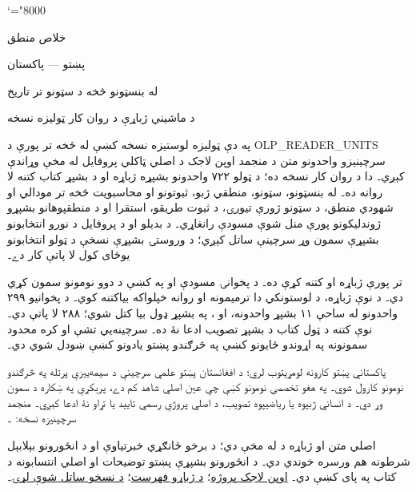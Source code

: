 \documentclass[11pt,a4paper,oneside]{report}
\theoremstyle{definition}
\begin{document}
\setRTL
\mathcode`\!="8000
\begin{titlepage}
\thispagestyle{empty}
\begin{center}
\vspace*{22mm}
{\Huge خلاص منطق}\par\bigskip
{\Large پښتو — پاکستان}\par\bigskip
{\LARGE له بنسټونو څخه د سټونو تر تاريخ}\par\bigskip
د ماشيني ژباړې د روان کار ټوليزه نسخه
\end{center}
\bigskip
\small
په دې ټوليزه لوستيزه نسخه کښې له  څخه تر
 پورې د OLP_READER_UNITS سرچينيزو واحدونو متن د
منجمد اوپن لاجک د اصلي ټاکلي پروفايل له مخې وړاندې کېږي۔ دا د روان کار
نسخه ده؛ د ټولو ۷۲۲ واحدونو بشپړه ژباړه او د بشپړ کتاب کتنه لا روانه ده۔
له بنسټونو، سټونو، منطقي ژبو، ثبوتونو او محاسبويت څخه تر مودالي او
شهودي منطق، د سټونو ژورې تيورۍ، د ثبوت طريقو، استقرا او د منطقپوهانو
بشپړو ژوندليکونو پورې منل شوې مسودې رانغاړي۔ د بديلو او د پروفايل
د نورو انتخابونو بشپړې سمون وړ سرچينې ساتل کېږي؛ د وروستۍ بشپړې نسخې
د ټولو انتخابونو يوځای کول لا پاتې کار دے۔

تر  پورې ژباړه او کتنه
 کړې ده۔
د  پخوانۍ مسودې او په
 کښې د دوو نومونو سمون
 کړي دي۔
د  نوې ژباړه، د لوستونکي دا ترميمونه
او روانه خپلواکه بياکتنه 
کوي۔ د پخوانيو ۲۹۹ واحدونو له ساحې ۱۱ بشپړ واحدونه،
 او ، په بشپړ
ډول بيا کتل شوي؛ ۲۸۸ لا پاتې دي۔ نوې کتنه د ټول کتاب د بشپړ
تصويب ادعا نۀ ده۔ سرچينه‌يي تشې او کره محدود سمونونه په اړوندو
ځايونو کښې په څرګندو پښتو يادونو کښې ښودل شوي دي۔

پاکستاني پښتو کارونه لومړيتوب لري؛ د افغانستان پښتو علمي سرچينې
د سيمه‌ييزې پرتله په څرګندو نومونو کارول شوي۔ په هغو تخصصي نومونو
کښې چې عين اصلي شاهد کم دے، پرېکړې په ښکاره د سمون وړ دي۔
د انساني ژبپوه يا رياضيپوه تصويب، د اصلي پروژې رسمي تاييد يا تړاو
نۀ ادعا کېږي۔ منجمد سرچينيزه نسخه:
۔

اصلي متن او ژباړه د \href{https://creativecommons.org/licenses/by/4.0/}{}
له مخې دي؛ د برخو ځانګړي خبرتياوې او د انځورونو بېلابېل شرطونه
هم ورسره خوندي دي۔ د انځورونو بشپړې پښتو توضيحات او اصلي
انتسابونه د کتاب په پای کښې دي۔
\href{https://openlogicproject.org/}{اوپن لاجک پروژه}؛
\href{https://github.com/KokunoYumeto/OpenLogic-translations}{د ژباړو فهرست}؛
\href{https://doi.org/10.5281/zenodo.22307197}{د نسخو ساتل شوې لړۍ}۔

\end{titlepage}
\tableofcontents
\clearpage
\end{document}
